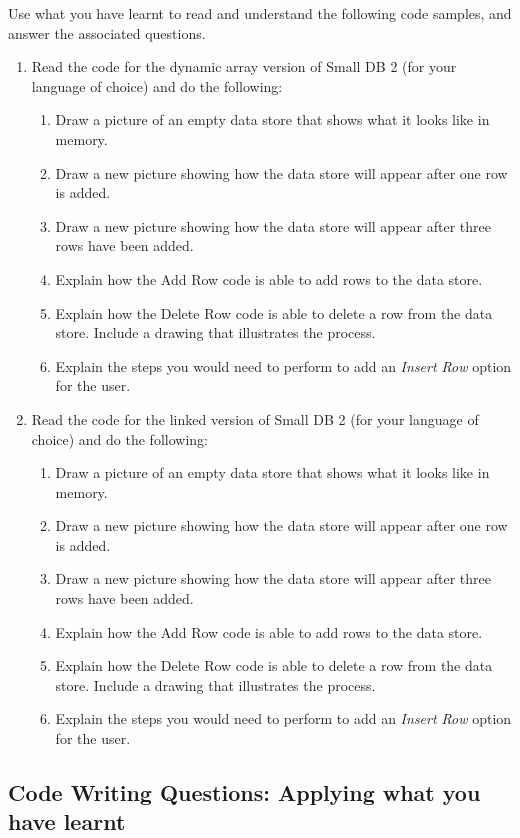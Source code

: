 Use what you have learnt to read and understand the following code samples, and answer the associated questions.
\begin{enumerate}
  \item Read the code for the dynamic array version of Small DB 2 (for your language of choice) and do the following:
  \begin{enumerate}
    \item Draw a picture of an empty data store that shows what it looks like in memory.
    \item Draw a new picture showing how the data store will appear after one row is added.
    \item Draw a new picture showing how the data store will appear after three rows have been added.
    \item Explain how the Add Row code is able to add rows to the data store.
    \item Explain how the Delete Row code is able to delete a row from the data store. Include a drawing that illustrates the process.
    \item Explain the steps you would need to perform to add an \emph{Insert Row} option for the user.
  \end{enumerate}
  \item Read the code for the linked version of Small DB 2 (for your language of choice) and do the following:
  \begin{enumerate}
    \item Draw a picture of an empty data store that shows what it looks like in memory.
    \item Draw a new picture showing how the data store will appear after one row is added.
    \item Draw a new picture showing how the data store will appear after three rows have been added.
    \item Explain how the Add Row code is able to add rows to the data store.
    \item Explain how the Delete Row code is able to delete a row from the data store. Include a drawing that illustrates the process.
    \item Explain the steps you would need to perform to add an \emph{Insert Row} option for the user.
  \end{enumerate}
\end{enumerate}

\clearpage
\subsection{Code Writing Questions: Applying what you have learnt} %
\label{sub:dynamic_memory_code_writing_questions_applying_what_you_have_learnt}


